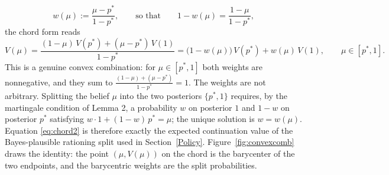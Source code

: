 \documentclass[12pt]{article}
\begin{document}
\begin{equation}\label{eq:weight}
w(\mu) := \frac{\mu-p^*}{1-p^*},
\qquad\text{so that}\qquad
1-w(\mu) = \frac{1-\mu}{1-p^*},
\end{equation}
the chord form reads
\begin{equation}\label{eq:chord2}
V(\mu) = \frac{(1-\mu)\,V(p^*) + (\mu-p^*)\,V(1)}{1-p^*}
= \big(1-w(\mu)\big)\,V(p^*) + w(\mu)\,V(1),
\qquad \mu\in[p^*,1].
\end{equation}
This is a genuine convex combination: for $\mu\in[p^*,1]$ both weights are nonnegative, and they sum to $\tfrac{(1-\mu)+(\mu-p^*)}{1-p^*}=1$. The weights are not arbitrary. Splitting the belief $\mu$ into the two posteriors $\{p^*,1\}$ requires, by the martingale condition of Lemma 2, a probability $w$ on posterior $1$ and $1-w$ on posterior $p^*$ satisfying $w\cdot 1+(1-w)\,p^*=\mu$; the unique solution is $w=w(\mu)$. Equation \eqref{eq:chord2} is therefore exactly the expected continuation value of the Bayes-plausible rationing split used in Section~\ref{Policy}. Figure~\ref{fig:convexcomb} draws the identity: the point $(\mu,V(\mu))$ on the chord is the barycenter of the two endpoints, and the barycentric weights are the split probabilities.
\end{document}
